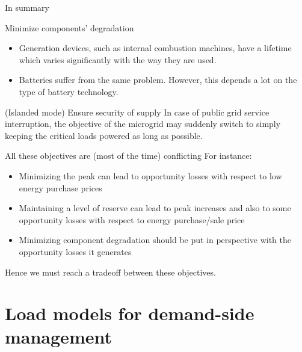 \begin{frame}{In summary}
\end{frame} \begin{frame}{Minimize components' degradation}
\begin{itemize}
  \item Generation devices, such as internal combustion machines, have a lifetime which varies significantly with the way they are used.
  \item Batteries suffer from the same problem. However, this depends a lot on the type of battery technology.
\end{itemize}

\end{frame} \begin{frame}{(Islanded mode) Ensure security of supply}
In case of public grid service interruption, the objective of the microgrid may suddenly switch to simply keeping the critical loads powered as long as possible.

\end{frame} \begin{frame}{All these objectives are (most of the time) conflicting}
For instance:
\begin{itemize}
  \item Minimizing the peak can lead to opportunity losses with respect to low energy purchase prices
  \item Maintaining a level of reserve can lead to peak increases and also to some opportunity losses with respect to energy purchase/sale price
  \item Minimizing component degradation should be put in perspective with the opportunity losses it generates
\end{itemize}
Hence we must reach a tradeoff between these objectives.


\end{frame} 

\section{Load models for demand-side management}

